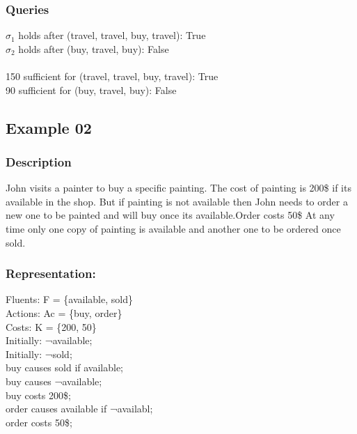 \documentclass[11pt]{article}
\begin{document}
	\subsubsection{Queries}
	$\sigma_{1}$ holds after (travel, travel, buy, travel): True\\
	$\sigma_{2}$ holds after (buy, travel, buy): False\\
	\\
	150 sufficient for (travel, travel, buy, travel): True\\
	90 sufficient for (buy, travel, buy): False\\
	\subsection{Example 02}\label{example:ex02}
	\subsubsection{Description}\label{par:p102}
	John visits a painter to buy a specific painting. The cost of painting is 200\$ if its available in the shop. But if painting is not available then John needs to order a new one to be painted and will buy once its available.Order costs 50\$ At any time only one copy of painting is available and another one to be ordered once sold. 
	
	\subsubsection{Representation:}\label{par:p202}
	\indent 
	Fluents: F = \{available, sold\}\\
	Actions: Ac = \{buy, order\}\\
	Costs: K = \{200, 50\}\\
	Initially: ¬available;\\
	Initially: ¬sold;\\
	buy causes sold if available;\\
	buy causes ¬available;\\
	buy costs 200\$;\\
	order causes available if ¬availabl;\\
	order costs 50\$; \\
	
\end{document}
